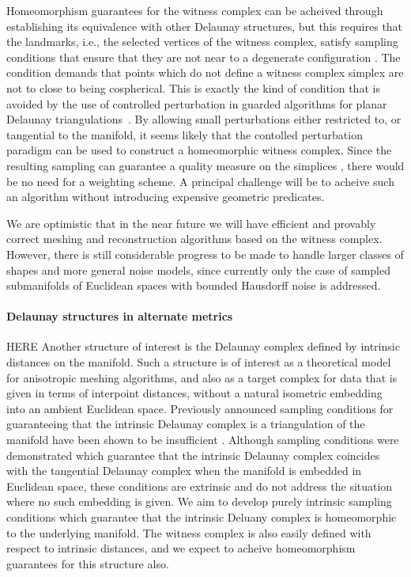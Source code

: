 Homeomorphism guarantees for the witness complex can be acheived
through establishing its equivalence with other Delaunay structures,
but this requires that the landmarks, i.e., the selected vertices of
the witness complex, satisfy sampling conditions that ensure that they
are not near to a degenerate configuration
\cite{boissonnat2011cgl,boissonnat2012stab}.  The condition demands
that points which do not define a witness complex simplex are not to
close to being cospherical. This is exactly the kind of condition that
is avoided by the use of controlled perturbation in guarded algorithms
for planar Delaunay triangulations~\cite{funke2005cp}. By allowing
small perturbations either restricted to, or tangential to the
manifold, it seems likely that the contolled perturbation paradigm can
be used to construct a homeomorphic witness complex. Since the
resulting sampling can guarantee a quality measure on the simplices
\cite{boissonnat2012stab}, there would be no need for a weighting
scheme.  A principal challenge will be to acheive such an algorithm
without introducing expensive geometric predicates.

We are optimistic that in the near future we will have efficient and
provably correct meshing and reconstruction algorithms based on the
witness complex.  However, there is still considerable progress to be
made to handle larger classes of shapes and more general noise models,
since currently only the case of sampled submanifolds of Euclidean
spaces with bounded Hausdorff noise is addressed.


\paragraph{Delaunay structures in alternate metrics}
HERE
Another structure of interest is the Delaunay complex defined by
intrinsic distances on the manifold. Such a structure is of interest
as a theoretical model for anisotropic meshing algorithms, and also as
a target complex for data that is given in terms of interpoint
distances, without a natural isometric embedding into an ambient
Euclidean space. Previously announced sampling conditions
\cite{leibon2000} for guaranteeing that the intrinsic Delaunay complex
is a triangulation of the manifold have been shown to be insufficient
\cite{boissonnat2012stab}. Although sampling conditions were
demonstrated which guarantee that the intrinsic Delaunay complex
coincides with the tangential Delaunay complex when the manifold is
embedded in Euclidean space, these conditions are extrinsic and do not
address the situation where no such embedding is given. We aim to
develop purely intrinsic sampling conditions which guarantee that the
intrinsic Deluany complex is homeomorphic to the underlying
manifold. The witness complex is also easily defined with respect to
intrinsic distances, and we expect to acheive homeomorphism guarantees
for this structure also.

